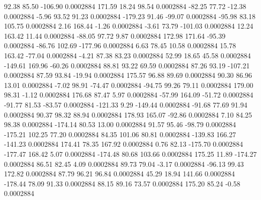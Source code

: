        92.38       85.50     -106.90     0.0002884
      171.59       18.24       98.54     0.0002884
      -82.25       77.72      -12.38     0.0002884
       -5.96       93.52       91.23     0.0002884
     -179.23       91.46      -99.07     0.0002884
      -95.98       83.18      105.75     0.0002884
        2.16      168.44       -1.26     0.0002884
       -3.61       73.79     -101.03     0.0002884
       12.24      163.42       11.44     0.0002884
      -88.05       97.72        9.87     0.0002884
      172.98      171.64      -95.39     0.0002884
      -86.76      102.69     -177.96     0.0002884
        6.63       78.45       10.58     0.0002884
       15.78      163.42      -77.04     0.0002884
       -4.21       87.38       83.23     0.0002884
       52.99       18.65       45.58     0.0002884
     -149.61      169.96      -60.26     0.0002884
       88.81       93.22       69.59     0.0002884
       87.26       93.19     -107.21     0.0002884
       87.59       93.84      -19.94     0.0002884
      175.57       96.88       89.69     0.0002884
       90.30       86.96       13.01     0.0002884
       -7.02       98.91      -74.47     0.0002884
      -94.75       99.26       79.11     0.0002884
      179.00       98.31       -1.12     0.0002884
      176.68       87.47        5.97     0.0002884
      -57.99      164.09      -51.72     0.0002884
      -91.77       81.53      -83.57     0.0002884
     -121.33        9.29     -149.44     0.0002884
      -91.68       77.69       91.94     0.0002884
       90.37       98.32       88.94     0.0002884
      178.93      165.07      -92.86     0.0002884
        7.10       84.25       98.38     0.0002884
     -174.14       80.53       13.00     0.0002884
       91.57       95.46      -98.79     0.0002884
     -175.21      102.25       77.20     0.0002884
       84.35      101.06       80.81     0.0002884
     -139.83      166.27     -141.23     0.0002884
      174.41       78.35      167.92     0.0002884
        0.76       82.13     -175.70     0.0002884
     -177.47      168.42        5.07     0.0002884
     -174.48       80.68      103.66     0.0002884
      175.25       11.89     -174.27     0.0002884
       86.51       82.45        4.09     0.0002884
       89.73       79.04       -3.17     0.0002884
      -96.13       99.43      172.82     0.0002884
       87.79       96.21       96.84     0.0002884
       45.29       18.94      141.66     0.0002884
     -178.44       78.09       91.33     0.0002884
       88.15       89.16       73.57     0.0002884
      175.20       85.24       -0.58     0.0002884
